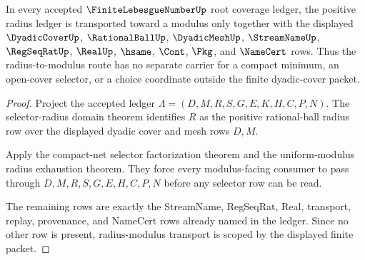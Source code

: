 \begin{theorem}
\label{thm:finite-lebesgue-number-radius-modulus-transport-scope}
In every accepted $\FiniteLebesgueNumberUp$ root coverage ledger, the positive radius ledger is transported toward a modulus only together with the displayed $\DyadicCoverUp$, $\RationalBallUp$, $\DyadicMeshUp$, $\StreamNameUp$, $\RegSeqRatUp$, $\RealUp$, $\hsame$, $\Cont$, $\Pkg$, and $\NameCert$ rows. Thus the radius-to-modulus route has no separate carrier for a compact minimum, an open-cover selector, or a choice coordinate outside the finite dyadic-cover packet.
\end{theorem}
\begin{proof}
Project the accepted ledger $\Lambda=(D,M,R,S,G,E,K,H,C,P,N)$. The selector-radius domain theorem identifies $R$ as the positive rational-ball radius row over the displayed dyadic cover and mesh rows $D,M$.

Apply the compact-net selector factorization theorem and the uniform-modulus radius exhaustion theorem. They force every modulus-facing consumer to pass through $D,M,R,S,G,E,H,C,P,N$ before any selector row can be read.

The remaining rows are exactly the StreamName, RegSeqRat, Real, transport, replay, provenance, and NameCert rows already named in the ledger. Since no other row is present, radius-modulus transport is scoped by the displayed finite packet.
\end{proof}

